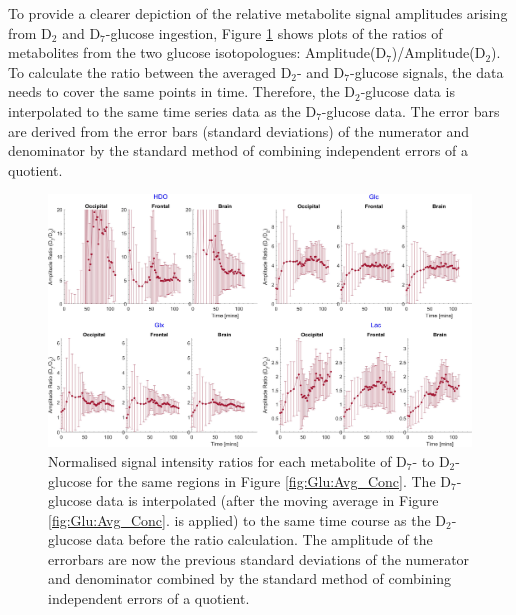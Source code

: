\documentclass[class=article, crop=false]{standalone}
\begin{document}
To provide a clearer depiction of the relative metabolite signal amplitudes arising from D$_2$ and D$_7$-glucose ingestion, Figure \ref{fig:Glu:D7_D2} shows plots of the ratios of metabolites from the two glucose isotopologues: Amplitude(D$_7$)/Amplitude(D$_2$). To calculate the ratio between the averaged D$_2$- and D$_7$-glucose signals, the data needs to cover the same points in time. Therefore, the D$_2$-glucose data is interpolated to the same time series data as the D$_7$-glucose data. The error bars are derived from the error bars (standard deviations) of the numerator and denominator by the standard method of combining independent errors of a quotient. 

\begin{figure}
    \centering
    \includegraphics[width = 1\textwidth]{Figures/Glucose/D7_D2.png}
    \caption{Normalised signal intensity ratios for each metabolite of D$_7$- to D$_2$-glucose for the same regions in Figure \ref{fig:Glu:Avg_Conc}. The D$_7$-glucose data is interpolated (after the moving average in Figure \ref{fig:Glu:Avg_Conc}. is applied) to the same time course as the D$_2$-glucose data before the ratio calculation. The amplitude of the errorbars are now the previous standard deviations of the numerator and denominator combined by the standard method of combining independent errors of a quotient.}
    \label{fig:Glu:D7_D2}
\end{figure}
\end{document}
